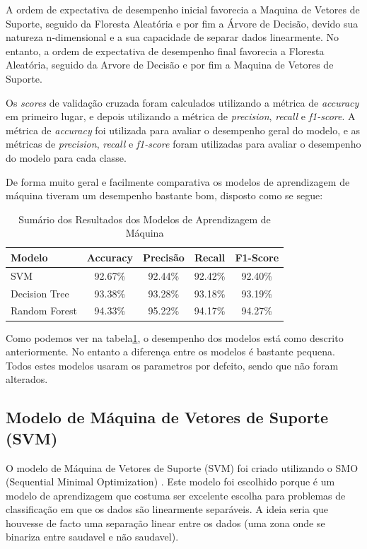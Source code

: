 \documentclass{easychair}
\begin{document}
A ordem de expectativa de desempenho inicial favorecia a Maquina de Vetores de Suporte, seguido da Floresta Aleatória e por fim a Árvore de Decisão, devido sua natureza n-dimensional e a sua capacidade de separar dados linearmente. No entanto, a ordem de expectativa de desempenho final favorecia a Floresta Aleatória, seguido da Arvore de Decisão e por fim a Maquina de Vetores de Suporte.

Os \textit{scores} de validação cruzada foram calculados utilizando a métrica de \textit{accuracy} em primeiro lugar, e depois utilizando a métrica de \textit{precision}, \textit{recall} e \textit{f1-score}. A métrica de \textit{accuracy} foi utilizada para avaliar o desempenho geral do modelo, e as métricas de \textit{precision}, \textit{recall} e \textit{f1-score} foram utilizadas para avaliar o desempenho do modelo para cada classe.

De forma muito geral e facilmente comparativa os modelos de aprendizagem de máquina tiveram um desempenho bastante bom, disposto como se segue:

\begin{table}[hbt!]
  \centering
  \begin{tabular}{l c c c c}
  \toprule
  Modelo         & Accuracy & Precisão  & Recall  & F1-Score \\
  \midrule
  SVM            & 92.67\%  & 92.44\%   & 92.42\% & 92.40\%  \\
  Decision Tree  & 93.38\%  & 93.28\%   & 93.18\% & 93.19\%  \\
  Random Forest  & 94.33\%  & 95.22\%   & 94.17\% & 94.27\%  \\
  \bottomrule
  \end{tabular}
  \caption{Sumário dos Resultados dos Modelos de Aprendizagem de Máquina}
  \label{tab:model-comparison}
\end{table}

Como podemos ver na tabela\ref{tab:model-comparison}, o desempenho dos modelos está como descrito anteriormente. No entanto a diferença entre os modelos é bastante pequena. Todos estes modelos usaram os parametros por defeito, sendo que não foram alterados.

\subsection{Modelo de Máquina de Vetores de Suporte (SVM)}

O modelo de Máquina de Vetores de Suporte (SVM) foi criado utilizando o SMO (Sequential Minimal Optimization) \cite{smo}. Este modelo foi escolhido porque é um modelo de aprendizagem que costuma ser excelente escolha para problemas de classificação em que os dados são linearmente separáveis. A ideia seria que houvesse de facto uma separação linear entre os dados (uma zona onde se binariza entre saudavel e não saudavel).
\end{document}
